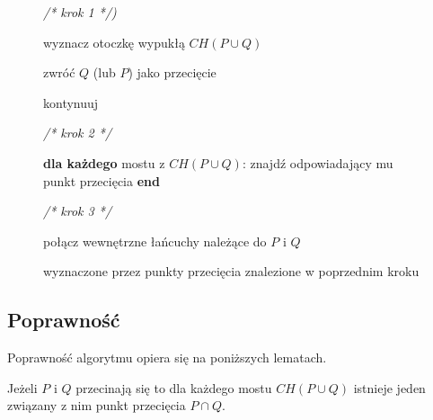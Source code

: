 \begin{figure}[htp]
  \begin{algorithmic}[1]

    \State \emph{/* krok 1 */)}

    \State wyznacz otoczkę wypukłą $CH(P \cup Q)$

    \State

    \State zwróć $Q$ (lub $P$) jako przecięcie

    \Else
    \State kontynuuj
    \EndIf

    \State

    \State \emph{/* krok 2 */}

    \State \textbf{dla każdego} mostu z $CH(P \cup Q)$:
    \State \hspace{\algorithmicindent} znajdź odpowiadający mu punkt
    przecięcia
    \State \textbf{end}

    \State

    \State \emph{/* krok 3 */}

    \State połącz wewnętrzne łańcuchy należące do $P$ i $Q$

    wyznaczone przez punkty przecięcia znalezione w poprzednim kroku

    \EndProcedure
  \end{algorithmic}
  \caption{\label{alg:interconpol}}
\end{figure}


\subsection{Poprawność}
Poprawność algorytmu opiera się na poniższych lematach.

\begin{lemat}
  Jeżeli $P$ i $Q$ przecinają się to dla każdego mostu $CH(P \cup Q)$
  istnieje jeden związany z nim punkt przecięcia $P \cap Q$.
\end{lemat}

